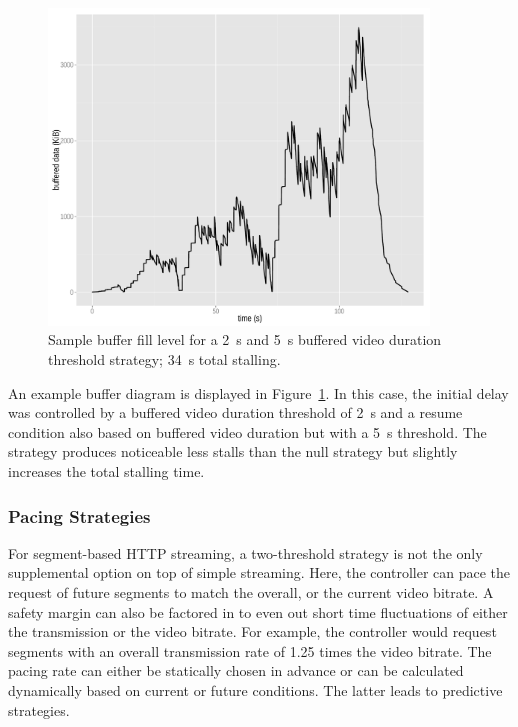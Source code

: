 \begin{figure}[htb]
    \centering
    \includegraphics[width=0.9\textwidth]{images/R-bufferlevel-flash.pdf}
    \caption{Sample buffer fill level for a \SI{2}{\second} and \SI{5}{\second} buffered video duration threshold strategy; \SI{34}{\second} total stalling.}
    \label{c3:fig:bufferlevel-flash}
\end{figure}

An example buffer diagram is displayed in Figure~\ref{c3:fig:bufferlevel-flash}. In this case, the initial delay was controlled by a buffered video duration threshold of \SI{2}{\second} and a resume condition also based on buffered video duration but with a \SI{5}{\second} threshold. The strategy produces noticeable less stalls than the null strategy but slightly increases the total stalling time.


\subsubsection{Pacing Strategies}

For segment-based \gls{HTTP} streaming, a two-threshold strategy is not the only supplemental option on top of simple streaming. Here, the controller can pace the request of future segments to match the overall, or the current video bitrate. A safety margin can also be factored in to even out short time fluctuations of either the transmission or the video bitrate. For example, the controller would request segments with an overall transmission rate of 1.25 times the video bitrate. The pacing rate can either be statically chosen in advance or can be calculated dynamically based on current or future conditions. The latter leads to predictive strategies.

